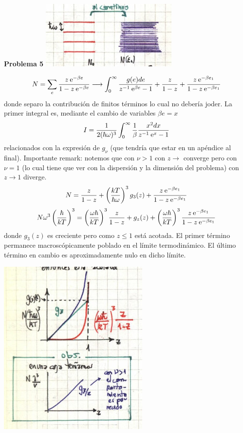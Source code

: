 \documentclass[10pt,oneside]{CBFT_book}
\begin{document}
\begin{ejemplo}{\bf Problema 5}
\includegraphics[scale=0.4]{images/1606329650.jpg}

\[
	N = \sum_e \frac{ z \:\mathrm{e}^{-\beta e} }{ 1 - z \:\mathrm{e}^{-\beta e}} \longrightarrow
	\int_0^\infty \frac{ g(e) de }{ z^{-1}\:\mathrm{e}^{\beta e} - 1} + \frac{z}{1-z} 
	+ \frac{ z \:\mathrm{e}^{-\beta e_1} }{ 1 - z \:\mathrm{e}^{-\beta e_1}} 
\]
donde separo la contribución de finitos términos lo cual no debería joder. La primer integral es,
mediante el cambio de variables $\beta e = x$
\[
	I = \frac{ 1 }{ 2 ( \hbar \omega )^3 } \int_0^\infty \frac{1}{\beta} \frac{ x^2 dx }{ z^{-1} \:\mathrm{e}^x - 1}
\]
relacionados con la expresión de $g_\nu$ (que tendría que estar en un apéndice al final).
Importante remark: notemos que con $\nu> 1$ con $z\to$ converge pero con $\nu=1$ (lo cual tiene que
ver con la dispersión y la dimensión del problema) con $z\to 1$ diverge.
\[
	N = \frac{z}{1-z} + \left( \frac{ kT }{ \hbar\omega } \right)^3 g_3(z) + 
	 \frac{ z \:\mathrm{e}^{-\beta e_1} }{ 1 - z \:\mathrm{e}^{-\beta e_1}} 
\]
\[
	N \omega^3 \left( \frac{  \hbar  }{  kT  } \right)^3 = 
	\left( \frac{  \omega \hbar  }{  kT  } \right)^3 \frac{ z }{ 1 - z } + g_z(z) + 
	\left( \frac{  \omega \hbar  }{  kT  } \right)^3 \frac{ z \:\mathrm{e}^{-\beta e_1} }{ 1 - z \:\mathrm{e}^{-\beta e_1}} 
\]
donde $g_3(z)$ es creciente pero como $z\leq 1$ está acotada. El primer término permanece macroscópicamente
poblado en el límite termodinámico. El último término en cambio es aproximadamente nulo en dicho límite.

\includegraphics[scale=0.4]{images/1606329656.jpg}


\end{ejemplo}
\end{document}
